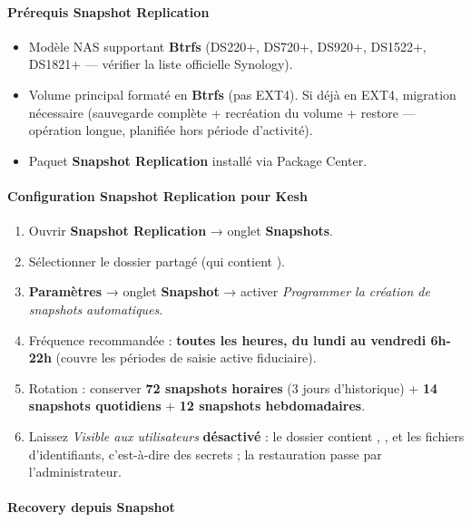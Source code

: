\documentclass[a4paper,11pt,oneside]{article}
\begin{document}
\paragraph{Prérequis Snapshot Replication}

\begin{itemize}
    \item Modèle NAS supportant \textbf{Btrfs} (DS220+, DS720+, DS920+, DS1522+, DS1821+ — vérifier la liste officielle Synology).
    \item Volume principal formaté en \textbf{Btrfs} (pas EXT4). Si déjà en EXT4, migration nécessaire (sauvegarde complète + recréation du volume + restore — opération longue, planifiée hors période d'activité).
    \item Paquet \textbf{Snapshot Replication} installé via Package Center.
\end{itemize}

\paragraph{Configuration Snapshot Replication pour Kesh}

\begin{enumerate}
    \item Ouvrir \textbf{Snapshot Replication} → onglet \textbf{Snapshots}.
    \item Sélectionner le dossier partagé  (qui contient ).
    \item \textbf{Paramètres} → onglet \textbf{Snapshot} → activer \emph{Programmer la création de snapshots automatiques}.
    \item Fréquence recommandée : \textbf{toutes les heures, du lundi au vendredi 6h-22h} (couvre les périodes de saisie active fiduciaire).
    \item Rotation : conserver \textbf{72 snapshots horaires} (3 jours d'historique) + \textbf{14 snapshots quotidiens} + \textbf{12 snapshots hebdomadaires}.
    \item Laissez \emph{Visible aux utilisateurs} \textbf{désactivé} : le dossier  contient , ,  et les fichiers d'identifiants, c'est-à-dire des secrets ; la restauration passe par l'administrateur.
\end{enumerate}

\paragraph{Recovery depuis Snapshot}\label{sec:backup-dsm-recovery}
\end{document}
